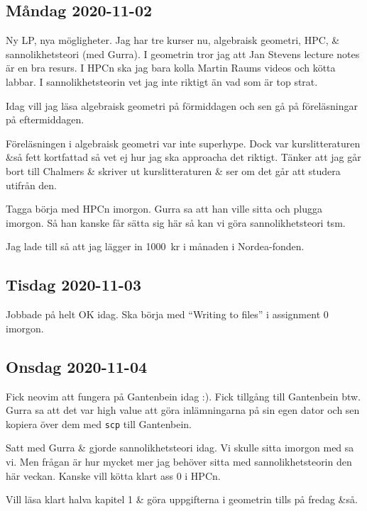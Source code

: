 \subsection{Måndag 2020-11-02}

Ny LP, nya mögligheter. Jag har tre kurser nu, algebraisk geometri, HPC, \& sannolikhetsteori (med Gurra). I geometrin tror jag att Jan Stevens lecture notes är en bra resurs. I HPCn ska jag bara kolla Martin Raums videos och kötta labbar. I sannolikhetsteorin vet jag inte riktigt än vad som är top strat.

Idag vill jag läsa algebraisk geometri på förmiddagen och sen gå på föreläsningar på eftermiddagen.

\bigskip

Föreläsningen i algebraisk geometri var inte superhype. Dock var kurslitteraturen \&så fett kortfattad så vet ej hur jag ska approacha det riktigt. Tänker att jag går bort till Chalmers \& skriver ut kurslitteraturen \& ser om det går att studera utifrån den.

Tagga börja med HPCn imorgon. Gurra sa att han ville sitta och plugga imorgon. Så han kanske får sätta sig här så kan vi göra sannolikhetsteori tsm.

\bigskip

Jag lade till så att jag lägger in \SI{1000}{kr} i månaden i Nordea-fonden.

\subsection{Tisdag 2020-11-03}

Jobbade på helt OK idag. Ska börja med \enquote{Writing to files} i assignment 0 imorgon.


\subsection{Onsdag 2020-11-04}

Fick neovim att fungera på Gantenbein idag :). Fick tillgång till Gantenbein btw. Gurra sa att det var high value att göra inlämningarna på sin egen dator och sen kopiera över dem med \verb+scp+ till Gantenbein.

Satt med Gurra \& gjorde sannolikhetsteori idag. Vi skulle sitta imorgon med sa vi. Men frågan är hur mycket mer jag behöver sitta med sannolikhetsteorin den här veckan. Kanske vill kötta klart ass 0 i HPCn.

Vill läsa klart halva kapitel 1 \& göra uppgifterna i geometrin tills på fredag \&så.


